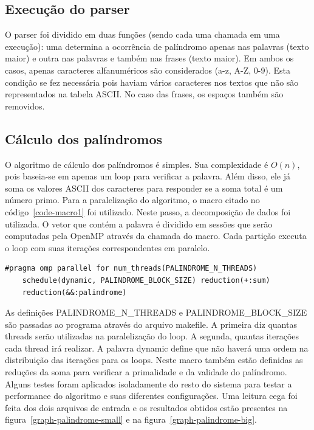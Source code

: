 \documentclass[a4paper]{article}
\begin{document}
\subsection{Execução do parser}
\indent \indent O parser foi dividido em duas funções (sendo cada uma chamada em uma execução): uma determina a ocorrência de palíndromo apenas nas palavras (texto maior) e outra nas palavras e também nas frases (texto maior). Em ambos os casos, apenas caracteres alfanuméricos são considerados (a-z, A-Z, 0-9). Esta condição se fez necessária pois haviam vários caracteres nos textos que não são representados na tabela ASCII. No caso das frases, os espaços também são removidos.

\subsection{Cálculo dos palíndromos}
\indent \indent O algoritmo de cálculo dos palíndromos é simples. Sua complexidade é \begin{math}O(n)\end{math}, pois baseia-se em apenas um loop para verificar a palavra. Além disso, ele já soma os valores ASCII dos caracteres para responder se a soma total é um número primo. Para a paralelização do algoritmo, o macro citado no código~\ref{code-macro1} foi utilizado. Neste passo, a decomposição de dados foi utilizada. O vetor que contém a palavra é dividido em sessões que serão computadas pela OpenMP através da chamada do macro. Cada partição executa o loop com suas iterações correspondentes em paralelo.
\begin{lstlisting}[caption=Macro que paraleliza o algoritmo do palíndromo, label=code-macro1]
#pragma omp parallel for num_threads(PALINDROME_N_THREADS) 
	schedule(dynamic, PALINDROME_BLOCK_SIZE) reduction(+:sum) 
	reduction(&&:palindrome)
\end{lstlisting}
\indent \indent As definições PALINDROME\_N\_THREADS e PALINDROME\_BLOCK\_SIZE são passadas ao programa através do arquivo makefile. A primeira diz quantas threads serão utilizadas na paralelização do loop. A segunda, quantas iterações cada thread irá realizar. A palavra dynamic define que não haverá uma ordem na distribuição das iterações para os loops. Neste macro também estão definidas as reduções da soma para verificar a primalidade e da validade do palíndromo.\\
\indent Alguns testes foram aplicados isoladamente do resto do sistema para testar a performance do algoritmo e suas diferentes configurações. Uma leitura cega foi feita dos dois arquivos de entrada e os resultados obtidos estão presentes na figura~\ref{graph-palindrome-small} e na figura~\ref{graph-palindrome-big}.
\end{document}
